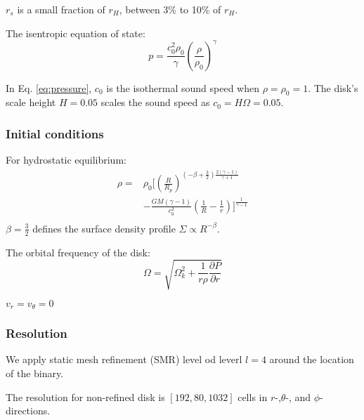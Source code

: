 \documentclass[twocolumn]{aastex631}
\begin{document}
$r_s$ is a small fraction of $r_H$, between 3\% to 10\% of $r_H$.

The isentropic equation of state:
\begin{equation}\label{eq:pressure}
    p = \frac{c_0^2\rho_0}{\gamma}\left(\frac{\rho}{\rho_0}\right)^\gamma
\end{equation}

In Eq. \ref{eq:pressure}, $c_0$ is the isothermal sound speed when $\rho=\rho_0=1$. 
The disk's scale height $H = 0.05$ scales the sound speed as $c_0 = H\Omega=0.05$.

\subsubsection{Initial conditions}
For hydrostatic equilibrium:
\begin{equation}\label{eq:density}
\begin{aligned}
     \rho = & \rho_0 \bigg[\left(\frac{R}{R_p}\right)^{(-\beta+\frac{3}{2})\frac{2(\gamma-1)}{\gamma+1}} \\ 
    & - \frac{GM(\gamma-1)}{c_0^2}\left(\frac{1}{R}-\frac{1}{r}\right)\bigg]^{\frac{1}{\gamma-1}} \\
\end{aligned}
\end{equation}
$\beta=\frac{3}{2}$ defines the surface density profile $\Sigma\propto R^{-\beta}$.

The orbital frequency of the disk:
\begin{equation}\label{eq:omegadisk}
    \Omega = \sqrt{\Omega_k^2+\frac{1}{r\rho}\frac{\partial P}{\partial r}}
\end{equation}

$v_r=v_\theta=0$


\subsubsection{Resolution}
We apply static mesh refinement (SMR) level od leverl $l=4$ around the location of the binary.

The resolution for non-refined disk is $[192,80,1032]$ cells in $r$-,$\theta$-, and $\phi$-directions. 
\end{document}
